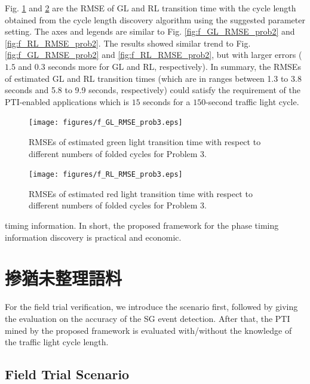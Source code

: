 \documentclass[final,oneside,onecolumn,12pt,a4paper]{book}%
\begin{document}
Fig. \ref{fig:f_GL_RMSE_prob3} and \ref{fig:f_RL_RMSE_prob3} are the RMSE of
GL and RL transition time with the cycle length obtained from the cycle length
discovery algorithm using the suggested parameter setting. The axes and
legends are similar to Fig. \ref{fig:f_GL_RMSE_prob2} and
\ref{fig:f_RL_RMSE_prob2}. The results showed similar trend to Fig.
\ref{fig:f_GL_RMSE_prob2} and \ref{fig:f_RL_RMSE_prob2}, but with larger
errors ($1.5$ and $0.3$ seconds more for GL and RL, respectively). In summary,
the RMSEs of estimated GL and RL transition times (which are in ranges between
1.3 to 3.8 seconds and 5.8 to 9.9 seconds, respectively) could satisfy the
requirement of the PTI-enabled applications which is $15$ seconds for a
$150$-second traffic light cycle.\begin{figure}[th]
\centerline{\texttt{[image: figures/f\_GL\_RMSE\_prob3.eps]}} \hfill\caption{RMSEs of estimated green light
transition time with respect to different numbers of folded cycles for Problem
3.}%
\label{fig:f_GL_RMSE_prob3}%
\end{figure}\begin{figure}[th]
\centerline{\texttt{[image: figures/f\_RL\_RMSE\_prob3.eps]}} \hfill\caption{RMSEs of estimated red light
transition time with respect to different numbers of folded cycles for Problem
3.}%
\label{fig:f_RL_RMSE_prob3}%
\end{figure}timing information. In short, the proposed framework for the phase
timing information discovery is practical and economic.

\chapter{摻猶未整理語料}

\label{cha:Impement}

For the field trial verification, we introduce the scenario first, followed by
giving the evaluation on the accuracy of the SG event detection. After that,
the PTI mined by the proposed framework is evaluated with/without the
knowledge of the traffic light cycle length.

\section{Field Trial Scenario}
\end{document}
